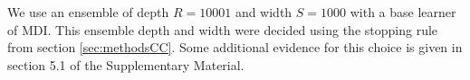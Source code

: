 \documentclass{bioinfo}
\begin{document}
We use an ensemble of depth $R=10001$ and width $S=1000$ with a base learner of MDI. This ensemble depth and width were decided using the stopping rule from section \ref{sec:methodsCC}. Some additional evidence for this choice is given in section 5.1 of the Supplementary Material.
\end{document}

